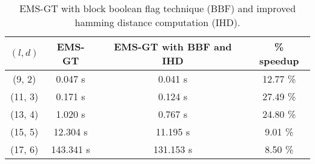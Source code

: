 \begin{table}[h] %
	\renewcommand{\arraystretch}{1.3}
	\centering
	\begin{tabular}{|c|c|c|c|}
	\hline 
	\bfseries\boldmath $(l,d)$ & 
	\bfseries\boldmath EMS-GT & 
	\bfseries\boldmath EMS-GT with BBF and IHD & 
	\bfseries \% speedup\\
	\hline
	(9, 2) & 0.047 s &		0.041 s 	&	12.77 \%\\
	(11, 3) & 0.171 s &		0.124 s 	&	27.49 \%\\
	(13, 4) & 1.020 s &		0.767 s 	&	24.80 \%\\
	(15, 5) & 12.304 s &	11.195 s  	&	9.01 \%\\
	(17, 6) & 143.341 s &	131.153 s 	&	8.50 \%\\
	\hline\end{tabular}
	
	\caption{EMS-GT with block boolean flag technique (BBF) and improved hamming distance computation (IHD).}
	\label{tbl:ems-gt-bf-hd-speedup}
\end{table}


